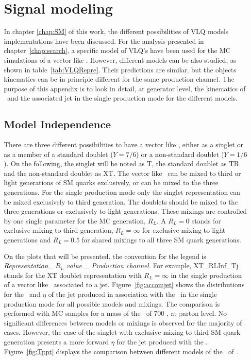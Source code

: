 \chapter{Signal modeling}
\label{chap:sigmod}

In chapter \ref{chap:SM} of this work, the different possibilities of VLQ models implementations have been discussed. For the analysis presented in chapter~\ref{chap:search}, a specific model of VLQ's have been used for the MC simulations of a vector like \Tp. However, different models can be also studied, as shown in table~\ref{tab:VLQRepre}. Their predictions are similar, but the objects kinematics can be in principle different for the same production channel. The purpose of this appendix is to look in detail, at generator level, the kinematics of \Tp~and the associated jet in the single production mode for the different models. %

\section{Model Independence}
\label{sec:modindp}

There are three different possibilities to have a vector like \Tp, either as a singlet or as a member of a standard doublet ($Y=7/6$) or a non-standard doublet ($Y=1/6$). On the following, the singlet will be noted as T, the standard doublet as TB and the non-standard doublet as XT. The vector like \Tp~can be mixed to third or light generations of SM quarks exclusively, or can be mixed to the three generations. For the single production mode only the singlet representation can be mixed exclusively to third generation. The doublets should be mixed to the three generations or exclusively to light generations. These mixings are controlled by one single parameter for the MC generation, $R_{L}$. A $R_{L}=0$ stands for exclusive mixing to third generation, $R_{L}=\infty$ for exclusive mixing to light generations and $R_{L}=0.5$ for shared mixings to all three SM quark generations. 

On the plots that will be presented, the convention for the legend is \textit{Representation\_ $R_{L}$ value \_ Production channel}. For example, XT\_RLInf\_Tj stands for the XT doublet representation with $R_{L}=\infty$ in the single production of a vector like \Tp~associated to a jet. Figure~\ref{fig:accomjet} shows the distributions for the \pt~and $\eta$ of the jet produced in association with the \Tp~in the single production mode for all possible models and mixings. The comparison is performed with MC samples for a mass of the \Tp~of 700 \GeVcc, at parton level. No significant differences between models or mixings is observed for the majority of cases. However, the case of the singlet with exclusive mixing to third SM quark generation presents a more forward $\eta$ for the jet produced with the \Tp. Figure~\ref{fig:Tppt} displays the comparison between different models of the \pt~of \Tp. 

